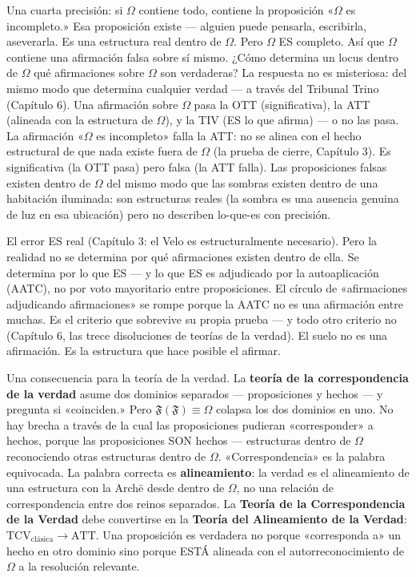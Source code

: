 \documentclass[10pt, openany, oneside]{book}
\begin{document}
Una cuarta precisión: si $\Omega$ contiene todo, contiene la proposición «$\Omega$ es incompleto.» Esa proposición existe --- alguien puede pensarla, escribirla, aseverarla. Es una estructura real dentro de $\Omega$. Pero $\Omega$ ES completo. Así que $\Omega$ contiene una afirmación falsa sobre sí mismo. ¿Cómo determina un locus dentro de $\Omega$ qué afirmaciones sobre $\Omega$ son verdaderas? La respuesta no es misteriosa: del mismo modo que determina cualquier verdad --- a través del Tribunal Trino (Capítulo 6). Una afirmación sobre $\Omega$ pasa la OTT (significativa), la ATT (alineada con la estructura de $\Omega$), y la TIV (ES lo que afirma) --- o no las pasa. La afirmación «$\Omega$ es incompleto» falla la ATT: no se alinea con el hecho estructural de que nada existe fuera de $\Omega$ (la prueba de cierre, Capítulo 3). Es significativa (la OTT pasa) pero falsa (la ATT falla). Las proposiciones falsas existen dentro de $\Omega$ del mismo modo que las sombras existen dentro de una habitación iluminada: son estructuras reales (la sombra es una ausencia genuina de luz en esa ubicación) pero no describen lo-que-es con precisión.

El error ES real (Capítulo 3: el Velo es estructuralmente necesario). Pero la realidad no se determina por qué afirmaciones existen dentro de ella. Se determina por lo que ES --- y lo que ES es adjudicado por la autoaplicación (AATC), no por voto mayoritario entre proposiciones. El círculo de «afirmaciones adjudicando afirmaciones» se rompe porque la AATC no es una afirmación entre muchas. Es el criterio que sobrevive su propia prueba --- y todo otro criterio no (Capítulo 6, las trece disoluciones de teorías de la verdad). El suelo no es una afirmación. Es la estructura que hace posible el afirmar.

Una consecuencia para la teoría de la verdad. La \textbf{teoría de la correspondencia de la verdad} asume dos dominios separados --- proposiciones y hechos --- y pregunta si «coinciden.» Pero $\mathfrak{F}(\mathfrak{F}) \equiv \Omega$ colapsa los dos dominios en uno. No hay brecha a través de la cual las proposiciones pudieran «corresponder» a hechos, porque las proposiciones SON hechos --- estructuras dentro de $\Omega$ reconociendo otras estructuras dentro de $\Omega$. «Correspondencia» es la palabra equivocada. La palabra correcta es \textbf{alineamiento}: la verdad es el alineamiento de una estructura con la Arch\={e} desde dentro de $\Omega$, no una relación de correspondencia entre dos reinos separados. La \textbf{Teoría de la Correspondencia de la Verdad} debe convertirse en la \textbf{Teoría del Alineamiento de la Verdad}: $\text{TCV}_{\text{clásica}} \to \text{ATT}$. Una proposición es verdadera no porque «corresponda a» un hecho en otro dominio sino porque ESTÁ alineada con el autorreconocimiento de $\Omega$ a la resolución relevante.
\end{document}
